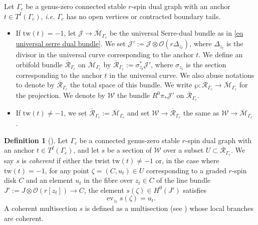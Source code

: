 \documentclass[11pt]{amsart}
\theoremstyle{definition}
\newtheorem{definition}[dummy]{Definition}
\theoremstyle{remark}
\newcommand{\tw}{\text{tw}}
\newcommand{\<}{\left<}
\renewcommand{\>}{\right>}
\numberwithin{equation}{section}
\def\Mbar{{\overline{\mathcal M}}}
\begin{document}
  Let $ \Gamma_c$ be a genus-zero connected stable $r$-spin dual graph with an anchor $t\in T^I(\Gamma_c)$, \textit{i.e.} $ \Gamma_c$  has no open vertices or contracted boundary tails.
  \begin{itemize}
      \item If $\tw(t)=-1$, let $\mathcal J\to \Mbar_{ \Gamma_c}$ be the universal Serre-dual bundle as %
in \eqref{eq universal serre dual bundle}. We set %
$\mathcal{J}' := \mathcal{J} \otimes \mathcal O \left( r\Delta_{z_t}\right)$, where $\Delta_{z_t}$ is the divisor in the universal curve corresponding to the anchor $t$.
    We define an orbifold bundle ${\overline{\mathcal{R}}}_{\Gamma_c}$ on $\Mbar_{ \Gamma_c}$ by
    ${\overline{\mathcal{R}}}_{ \Gamma_c}:= \sigma_{z_t}^*\mathcal{J}'$,
     where $\sigma_{z_t}$ is the section corresponding to the  anchor $t$ in the universal curve. We also abuse notations to denote by ${\overline{\mathcal{R}}}_{ \Gamma_c}$ the total space of this bundle. We write
$\wp: {\overline{\mathcal{R}}}_{ \Gamma_c} \to \Mbar_{ \Gamma_c}$ for the projection.     We denote by ${\mathcal{W}}$ the  bundle $R^0\pi_*\mathcal{J}'$ on ${\overline{\mathcal{R}}}_{\Gamma_c}$.
\item If $\tw(t)\ne -1$, we set ${\overline{\mathcal{R}}}_{ \Gamma_c}:=\Mbar_{\Gamma_c}$ and set $\mathcal W\to {\overline{\mathcal{R}}}_{ \Gamma_c}$ the same as $\mathcal W\to \Mbar_{\Gamma_c}$%
.
  \end{itemize}
  

\begin{definition}[{\cite[Definition 4.2]{BCT2}}]
\label{def coherent}
 Let $ \Gamma_c$ be a connected genus-zero stable %
$r$-spin dual graph with an anchor $t\in T^I(\Gamma_c)$, and let $s$ be a section of $\mathcal{W}$ over a subset $U\subset{\overline{\mathcal{R}}}_{\Gamma_c}$. We say $s$ is \textit{coherent} if either the twist %
$\tw(t)\ne -1$ or, %
in the case where $\tw(t)= -1$, for any point $\zeta=(C, u_t) \in U$  corresponding to a graded $r$-spin disk $C$ and an element $u_t$ in the fibre over $z_t\in C$ of the line bundle $J':=J\otimes \mathcal O(r[z_t])\to C$, the element $s(\zeta) \in H^0(J')$ %
satisfies
$$\operatorname{ev}_{z_t}s(\zeta) = u_t.$$ A coherent multisection $s$ is defined as a multisection  (see \cite[Appendix A]{BCT2}) whose %
local branches are coherent. 

\end{definition}
\end{document}
